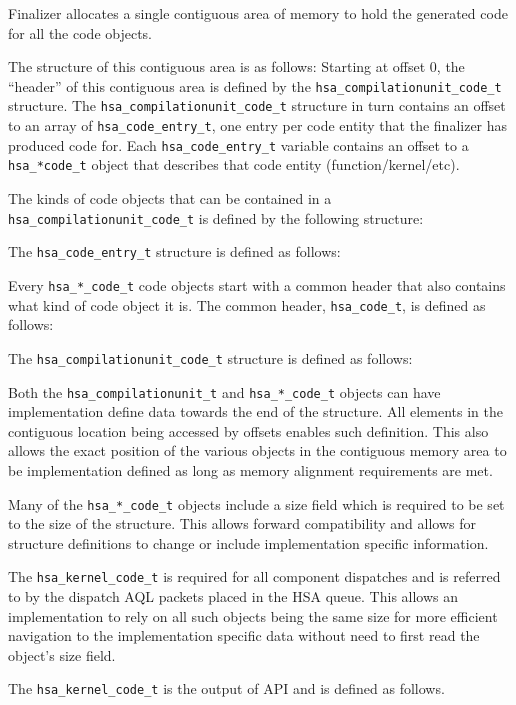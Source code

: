 Finalizer allocates a single contiguous area of memory to hold the
generated code for all the code objects.

The structure of this contiguous area is as follows: Starting at
offset 0, the ``header'' of this contiguous area is defined by the
\texttt{hsa\_compilationunit\_code\_t} structure. The
\texttt{hsa\_compilationunit\_code\_t} structure in turn contains
an offset to an array of \texttt{hsa\_code\_entry\_t}, one entry per
code entity that the finalizer has produced code for. Each
\texttt{hsa\_code\_entry\_t} variable contains an offset to a
\texttt{hsa\_*code\_t} object that describes that code entity
(function/kernel/etc).

The kinds of code objects that can be contained in a
\texttt{hsa\_compilationunit\_code\_t} is defined by the following
structure:


The \texttt{hsa\_code\_entry\_t} structure is defined as follows:


Every \texttt{hsa\_*\_code\_t} code objects start with a common
header that also contains what kind of code object it is. The common
header, \texttt{hsa\_code\_t}, is defined as follows:


The \texttt{hsa\_compilationunit\_code\_t} structure is defined as
follows:


Both the \texttt{hsa\_compilationunit\_t} and
\texttt{hsa\_*\_code\_t} objects can have implementation define data
towards the end of the structure. All elements in the contiguous
location being accessed by offsets enables such definition.  This
also allows the exact position of the various objects in the
contiguous memory area to be implementation defined as long as
memory alignment requirements are met. 

Many of the \texttt{hsa\_*\_code\_t} objects include a size field
which is required to be set to the size of the structure. This
allows forward compatibility and allows for structure definitions to
change or include implementation specific information.

The \texttt{hsa\_kernel\_code\_t} is required for all component
dispatches and is referred to by the dispatch AQL packets placed in
the HSA queue. This allows an implementation to rely on all such
objects being the same size for more efficient navigation to the
implementation specific data without need to first read the object's
size field.

The \texttt{hsa\_kernel\_code\_t} is the output of
 API and is defined as follows.

